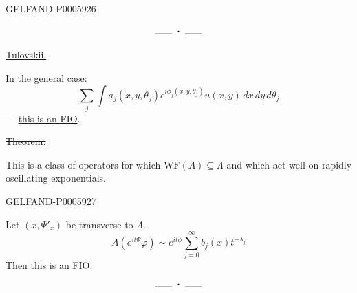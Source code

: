\begin{GelfandAdjacentEvidence}{GELFAND-P000592}{6}

\[
\rule{1.8em}{.4pt}\;\boldsymbol{\cdot}\;\rule{1.8em}{.4pt}
\]

\underline{Tulovskii.}

In the general case:
\[
\sum_j\int a_j(x,y,\theta_j)e^{i\phi_j(x,y,\theta_j)}
 u(x,y)\,dx\,dy\,d\theta_j
\]
— \underline{this is an FIO}.

\sout{Theorem.}

This is a class of operators for which \(\mathrm{WF}(A)\subseteq\Lambda\) and which act well on rapidly oscillating exponentials.
\end{GelfandAdjacentEvidence}
\begin{GelfandAdjacentEvidence}{GELFAND-P000592}{7}

\end{GelfandAdjacentEvidence}


Let \((x,\Psi'_x)\) be transverse to \(\Lambda\).
\[
A(e^{it\Psi}\varphi)\sim e^{it\phi}\sum_{j=0}^{\infty}b_j(x)t^{-\lambda_j}
\]
Then this is an FIO.
\[
\rule{1.8em}{.4pt}\;\boldsymbol{\cdot}\;\rule{1.8em}{.4pt}
\]


